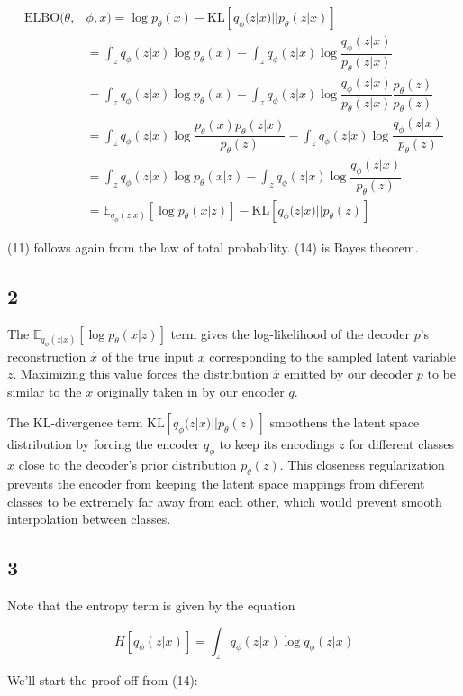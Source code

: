 \documentclass{article}
\begin{document}
\begin{align}
    \text{ELBO}(\theta, &\phi, x) 
    = \log p_\theta(x) - \text{KL}[q_\phi(z|x) || p_\theta(z|x)] \\
    &= \int_{z} q_\phi(z|x) \log p_\theta(x) - \int_z q_\phi(z|x) \log \dfrac{q_\phi(z|x)}{p_\theta(z|x)} \\ 
    &= \int_{z} q_\phi(z|x) \log p_\theta(x) - \int_z q_\phi(z|x) \log \dfrac{q_\phi(z|x)}{p_\theta(z|x)} \dfrac{p_\theta(z)}{p_\theta(z)} \\
    &= \int_{z} q_\phi(z|x) \log \dfrac{p_\theta(x) p_\theta(z|x)}{p_\theta(z)} - \int_z q_\phi(z|x) \log \dfrac{q_\phi(z|x)}{p_\theta(z)} \\ 
    &= \int_{z} q_\phi(z|x) \log p_\theta(x|z) - \int_z q_\phi(z|x) \log \dfrac{q_\phi(z|x)}{p_\theta(z)} \\
    &= \mathbb{E}_{q_\phi (z|x)} [\log p_\theta(x|z)] - \text{KL}[q_\phi(z|x) || p_\theta(z)]
\end{align}

(11) follows again from the law of total probability.
(14) is Bayes theorem.

\subsection{2}
The $\mathbb{E}_{q_\phi (z|x)} [\log p_\theta(x|z)]$ term gives the log-likelihood of the decoder $p$'s reconstruction $\hat{x}$ of the true input $x$ corresponding to the sampled latent variable $z$. Maximizing this value forces the distribution $\hat{x}$ emitted by our decoder $p$ to be similar to the $x$ originally taken in by our encoder $q$.

The KL-divergence term $\text{KL}[q_\phi(z|x) || p_\theta(z)]$ smoothens the latent space distribution by forcing the encoder $q_\phi$ to keep its encodings $z$ for different classes $x$ close to the decoder's prior distribution $p_\theta(z)$. This closeness regularization prevents the encoder from keeping the latent space mappings from different classes to be extremely far away from each other, which would prevent smooth interpolation between classes.

\subsection{3}
Note that the entropy term is given by the equation

$$H[q_\phi(z|x)] = \int_z q_\phi (z|x) \log q_\phi(z|x)$$

We'll start the proof off from (14):
\end{document}
